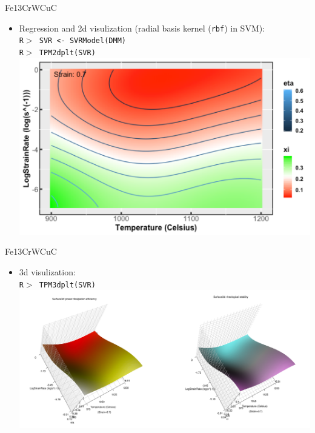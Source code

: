 \documentclass[11pt]{beamer}
\newcommand{\code}[1]{\texttt{#1}}
\begin{document}
\begin{frame}[t]{Fe{\color{red}13Cr}WCuC}
	\begin{minipage}[t]{1\textwidth}
        \vspace{0pt}
        \begin{itemize}
            \item {\small Regression and 2d visulization (radial basis kernel (\code{rbf}) in SVM):\\
            {\scriptsize\code{R$>$ SVR <- SVRModel(DMM)\\
            R$>$ TPM2dplt(SVR)
            }}
            }\\
            \includegraphics[scale=0.38]{Fig8.png}
        \end{itemize}
    \end{minipage}%
\end{frame}

\begin{frame}[t]{Fe{\color{red}13Cr}WCuC}
	\begin{minipage}[t]{1\textwidth}
        \vspace{0pt}
        \begin{itemize}
            \item {\small 3d visulization:\\
            {\scriptsize\code{R$>$ TPM3dplt(SVR)
            }}
            }\\
            \includegraphics[scale=0.157]{Fig9.png}
        \end{itemize}
    \end{minipage}%
\end{frame}
\end{document}
